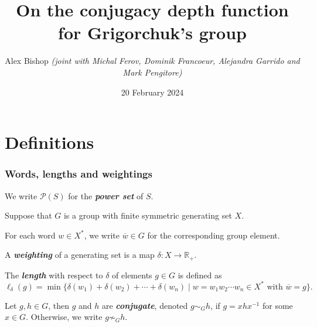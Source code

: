 \documentclass[aspectratio=169,10pt]{beamer}
\author[A.~Bishop]{Alex Bishop \textit{(joint with Michal Ferov, Dominik Francoeur, Alejandra Garrido and Mark Pengitore)}}
\title{On the conjugacy depth function for Grigorchuk's group}
\institute{Université de Genève}
\date{20 February 2024}
\renewcommand{\emph}[1]{\textit{\bfseries{\color{OwlYellow}#1}}}
\begin{document}
\maketitle

\setlength{\belowdisplayskip}{0pt} \setlength{\belowdisplayshortskip}{0pt}
\setlength{\abovedisplayskip}{0pt} \setlength{\abovedisplayshortskip}{0pt}

\section{Definitions}


\begin{frame}\nocite{Grigorchuk2005,conjugacy_polynomial,lineartime_conjugacy}
	\frametitle{Words, lengths and weightings}

	We write $\mathcal P (S)$ for the \emph{power set} of $S$.

	Suppose that $G$ is a group with finite symmetric generating set $X$.

	For each word $w\in X^*$, we write $\overline{w}\in G$ for the corresponding group element.

	\begin{definition}[weights]
		A \emph{weighting} of a generating set is a map $\delta\colon X\to \mathbb R_+$.
	\end{definition}

	\begin{definition}[lengths]
		The \emph{length} with respect to $\delta$ of elements $g\in G$ is defined as
		\[
			\ell_\delta(g)
			=
			\min \{
			\delta(w_1)+\delta(w_2)+\cdots+\delta(w_n)
			\mid
			w=w_1w_2\cdots w_n\in X^*
			\text{ with }
			\overline{w} = g
			\}.
		\]
	\end{definition}

	\begin{definition}[conjugate]
		Let $g,h\in G$, then $g$ and $h$ are \emph{conjugate}, denoted $g\sim_G h$, if $g = xhx^{-1}$ for some $x\in G$.
		Otherwise, we write $g\not\sim_G h$.
	\end{definition}

\end{frame}

\end{document}
